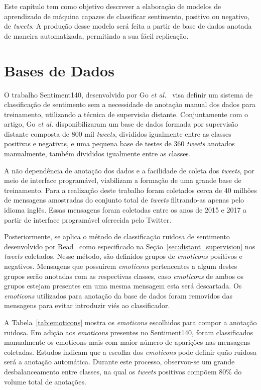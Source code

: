 Este capítulo tem como objetivo descrever a elaboração de modelos de aprendizado de máquina capazes de classificar
sentimento, positivo ou negativo, de \textit{tweets}.
A produção desse modelo será feita a partir de base de dados anotada de maneira automatizada, permitindo a sua
fácil replicação.

\section{Bases de Dados} \label{sec:data}

O trabalho Sentiment140, desenvolvido por Go \textit{et al.}~\cite{go09} visa definir um sistema de classificação de
sentimento sem a necessidade de anotação manual dos dados para treinamento, utilizando a técnica de supervisão distante.
Conjuntamente com o artigo, Go \textit{et al.} disponibilizaram um base de dados formada por supervisão distante composta
de 800 mil \textit{tweets}, divididos igualmente entre as classes positivas e negativas, e uma pequena base de testes de
360 \textit{tweets} anotados manualmente, também divididos igualmente entre as classes.

A não dependência de anotação dos dados e a facilidade de coleta dos \textit{tweets}, por meio de interface programável,
viabilizam a formação de uma grande base de treinamento.
Para a realização deste trabalho foram coletados cerca de 40 milhões de mensagens amostradas do conjunto total de
\textit{tweets} filtrando-as apenas pelo idioma inglês.
Essas mensagens foram coletadas entre os anos de 2015 e 2017 a partir de interface programável oferecida pelo Twitter.

Posteriormente, se aplica o método de classificação ruidosa de sentimento desenvolvido por Read~\cite{read05} como
especificado na Seção~\ref{sec:distant_supervision} nos \textit{tweets} coletados.
Nesse método, são definidos grupos de \textit{emoticons} positivos e negativos.
Mensagens que possuírem \textit{emoticons} pertencentes a algum destes grupos serão anotadas com as respectivas classes,
caso \textit{emoticons} de ambos os grupos estejam presentes em uma mesma mensagem esta será descartada.
Os \textit{emoticons} utilizados para anotação da base de dados foram removidos das mensagens para evitar introduzir
viés ao classificador.

A Tabela~\ref{tab:emoticons} mostra os \textit{emoticons} escolhidos para compor a anotação ruidosa.
Em adição aos \textit{emoticons} presentes no Sentiment140, foram classificados manualmente os emoticons mais com maior
número de aparições nas mensagens coletadas.
Estudos indicam que a escolha dos \textit{emoticons} pode definir quão ruidosa será a anotação automática.
Durante este processo, observou-se um grande desbalanceamento entre classes, na qual os \textit{tweets} positivos
compõem 80\% do volume total de anotações.

